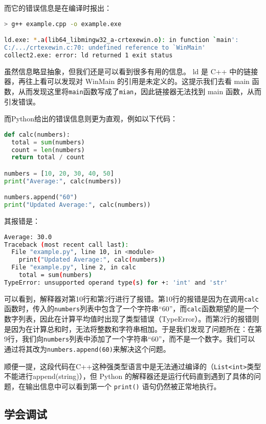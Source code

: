 \documentclass[../main.tex]{subfiles}
\begin{document}
而它的错误信息是在编译时报出：

\begin{lstlisting}[language=bash]
> g++ example.cpp -o example.exe

ld.exe: *.a(lib64_libmingw32_a-crtexewin.o): in function `main':
C:/.../crtexewin.c:70: undefined reference to `WinMain'
collect2.exe: error: ld returned 1 exit status
\end{lstlisting}

虽然信息略显抽象，但我们还是可以看到很多有用的信息。 ld 是 C++ 中的链接器，再往上看可以发现对 WinMain 的引用是未定义的。这提示我们去看 main 函数，从而发现这里将\texttt{main}函数写成了\texttt{mian}，因此链接器无法找到 main 函数，从而引发错误。

而Python给出的错误信息则更为直观，例如以下代码：

\begin{lstlisting}[language=Python]
def calc(numbers):
  total = sum(numbers)
  count = len(numbers)
  return total / count

numbers = [10, 20, 30, 40, 50]
print("Average:", calc(numbers))

numbers.append("60")
print("Updated Average:", calc(numbers))
\end{lstlisting}

其报错是：
\begin{lstlisting}[language=bash]
Average: 30.0
Traceback (most recent call last):
  File "example.py", line 10, in <module>
    print("Updated Average:", calc(numbers))
  File "example.py", line 2, in calc
    total = sum(numbers)
TypeError: unsupported operand type(s) for +: 'int' and 'str'
\end{lstlisting}

可以看到，解释器对第10行和第2行进行了报错。第10行的报错是因为在调用\texttt{calc}函数时，传入的\texttt{numbers}列表中包含了一个字符串“60”，而\texttt{calc}函数期望的是一个数字列表，因此在计算平均值时出现了类型错误（TypeError）。而第2行的报错则是因为在计算总和时，无法将整数和字符串相加。于是我们发现了问题所在：在第9行，我们向\texttt{numbers}列表中添加了一个字符串“60”，而不是一个数字。我们可以通过将其改为\texttt{numbers.append(60)}来解决这个问题。

顺便一提，这段代码在C++这种强类型语言中是无法通过编译的（\texttt{List<int>}类型不能进行append(string)），但 Python 的解释器还是运行代码直到遇到了具体的问题，在输出信息中可以看到第一个 \texttt{print()} 语句仍然被正常地执行。

\subsection{学会调试}\label{subsec:debugging}
\end{document}
